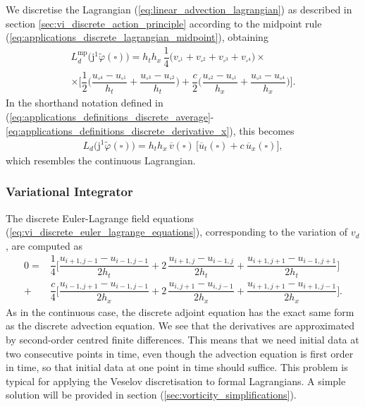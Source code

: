 \documentclass[12pt,a4paper,reqno]{article}
\begin{document}
We discretise the Lagrangian (\ref{eq:linear_advection_lagrangian}) as described in section \ref{sec:vi_discrete_action_principle} according to the midpoint rule (\ref{eq:applications_discrete_lagrangian_midpoint}), obtaining
\begin{multline}\label{eq:linear_advection_discrete_lagrangian_midpoint}
L_{d}^{\mathrm{mp}} \big( {\ensuremath{\mathrm{j}}}^{1} \tilde{\ensuremath{\varphi}} (\square) \big) = h_{t} h_{x} \, \dfrac{1}{4} \Big( v_{\square^{1}} + v_{\square^{2}} + v_{\square^{3}} + v_{\square^{4}} \Big) \times \\
\times \bigg[ \dfrac{1}{2} \bigg( \dfrac{u_{\square^{4}} - u_{\square^{1}}}{h_{t}} + \dfrac{u_{\square^{3}} - u_{\square^{2}}}{h_{t}} \bigg) + \dfrac{c}{2} \bigg( \dfrac{u_{\square^{2}} - u_{\square^{1}}}{h_{x}} + \dfrac{u_{\square^{3}} - u_{\square^{4}}}{h_{x}} \bigg) \bigg] .
\end{multline}
In the shorthand notation defined in (\ref{eq:applications_definitions_discrete_average}-\ref{eq:applications_definitions_discrete_derivative_x}), this becomes
\begin{align}\label{eq:linear_advection_discrete_lagrangian_short}
L_{d} \big( {\ensuremath{\mathrm{j}}}^{1} \tilde{\ensuremath{\varphi}} (\square) \big)
= h_{t} h_{x} \, \overline{v} (\square) \, \big[ \overline{u}_{t} (\square) + c \, \overline{u}_{x} (\square) \big] ,
\end{align}
which resembles the continuous Lagrangian.

\subsubsection*{Variational Integrator}

The discrete Euler-Lagrange field equations (\ref{eq:vi_discrete_euler_lagrange_equations}), corresponding to the variation of $v_{d}$, are computed as
\begin{align}\label{eq:linear_advection_integrator}
0
\nonumber
=& \dfrac{1}{4} \bigg[ \dfrac{u_{i+1, j-1} - u_{i-1, j-1}}{2 h_{t}} + 2 \, \dfrac{u_{i+1, j} - u_{i-1, j}}{2 h_{t}} + \dfrac{u_{i+1, j+1} - u_{i-1, j+1}}{2 h_{t}} \bigg] \\
+& \dfrac{c}{4} \bigg[ \dfrac{u_{i-1, j+1} - u_{i-1, j-1}}{2 h_{x}} + 2 \, \dfrac{u_{i, j+1} - u_{i, j-1}}{2 h_{x}} + \dfrac{u_{i+1, j+1} - u_{i+1, j-1}}{2 h_{x}} \bigg] .
\end{align}
As in the continuous case, the discrete adjoint equation has the exact same form as the discrete advection equation.
We see that the derivatives are approximated by second-order centred finite differences. This means that we need initial data at two consecutive points in time, even though the advection equation is first order in time, so that initial data at one point in time should suffice.
This problem is typical for applying the Veselov discretisation to formal Lagrangians.
A simple solution will be provided in section (\ref{sec:vorticity_simplifications}).
\end{document}
